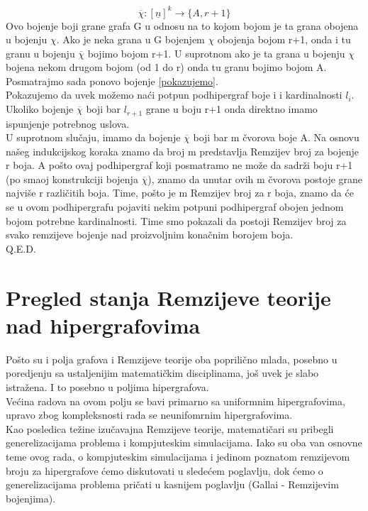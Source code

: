 \documentclass[a4paper]{article}
\begin{document}
\begin{description}
\begin{equation}
			\overline{\chi} : [\underline{n}]^k \rightarrow \{A, r+1\}
		\end{equation}
		Ovo bojenje  boji grane grafa G u odnosu na to kojom bojom je ta grana obojena u bojenju $\chi$. Ako je neka grana u G bojenjem $\chi$ obojenja bojom r+1, onda i tu granu u bojenju $\overline{\chi}$ bojimo bojom r+1. U suprotnom ako je ta grana u bojenju $\chi$ bojena nekom drugom bojom (od 1 do r) onda tu granu bojimo bojom A.\\
		Posmatrajmo sada ponovo bojenje \ref{pokazujemo}.\\
		Pokazujemo da uvek možemo naći potpun podhipergraf boje i i kardinalnosti $l_i$.
		Ukoliko bojenje $\overline{\chi}$ boji bar $l_{r+1}$ grane u boju r+1 onda direktno imamo ispunjenje potrebnog uslova.
		\\
		U suprotnom slučaju, imamo da bojenje $\overline{\chi}$ boji bar m čvorova boje A. Na osnovu našeg indukcijskog koraka znamo da broj m predstavlja Remzijev broj za bojenje r boja. A pošto ovaj podhipergraf koji posmatramo ne može da sadrži boju r+1 (po smaoj konstrukciji bojenja $\overline{\chi}$), znamo da unutar ovih m čvorova postoje grane najviše r različitih boja. Time, pošto je m Remzijev broj za r boja, znamo da će se u ovom podhipergrafu pojaviti nekim potpuni podhipergraf obojen jednom bojom potrebne kardinalnosti. Time smo pokazali da postoji Remzijev broj za svako remzijeve bojenje nad proizvoljnim konačnim borojem boja. \\
		Q.E.D.
 	\end{description}
	\section{Pregled stanja Remzijeve teorije nad hipergrafovima}
	Pošto su i polja grafova i Remzijeve teorije oba poprilično mlada, posebno u poredjenju sa ustaljenijim matematičkim disciplinama, još uvek je slabo istražena. I to posebno u poljima hipergrafova.\\ Većina radova na ovom polju se bavi primarno sa uniformnim hipergrafovima, upravo zbog kompleksnosti rada se neunifomrnim hipergrafovima.\\ Kao posledica težine izučavajna Remzijeve teorije, matematičari su pribegli generelizacijama problema i kompjuteskim simulacijama. Iako su oba van osnovne teme ovog rada, o kompjuteskim simulacijama i jedinom poznatom remzijevom broju za hipergrafove ćemo diskutovati u sledećem poglavlju, dok ćemo o generelizacijama problema pričati u kasnijem poglavlju (Gallai - Remzijevim bojenjima).
\end{document}

